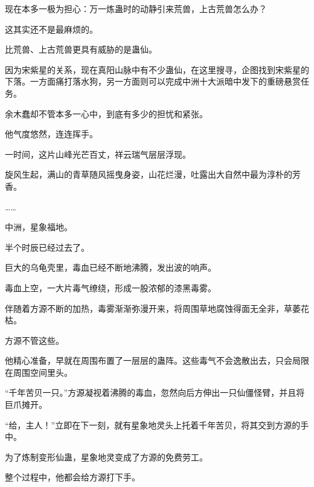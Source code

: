 \begin{this_body}
现在本多一极为担心：万一炼蛊时的动静引来荒兽，上古荒兽怎么办？

这其实还不是最麻烦的。

比荒兽、上古荒兽更具有威胁的是蛊仙。

因为宋紫星的关系，现在真阳山脉中有不少蛊仙，在这里搜寻，企图找到宋紫星的下落。一方面痛打落水狗，另一方面则可以完成中洲十大派暗中发下的重磅悬赏任务。

余木蠢却不管本多一心中，到底有多少的担忧和紧张。

他气度悠然，连连挥手。

一时间，这片山峰光芒百丈，祥云瑞气层层浮现。

旋风生起，满山的青草随风摇曳身姿，山花烂漫，吐露出大自然中最为淳朴的芳香。

……

中洲，星象福地。

半个时辰已经过去了。

巨大的乌龟壳里，毒血已经不断地沸腾，发出波的响声。

毒血上空，一大片毒气缭绕，形成一股浓郁的漆黑毒雾。

伴随着方源不断的加热，毒雾渐渐弥漫开来，将周围草地腐蚀得面无全非，草萎花枯。

方源不管这些。

他精心准备，早就在周围布置了一层层的蛊阵。这些毒气不会逸散出去，只会局限在周围空间里头。

“千年苦贝一只。”方源凝视着沸腾的毒血，忽然向后方伸出一只仙僵怪臂，并且将巨爪摊开。

“给，主人！”立即在下一刻，就有星象地灵头上托着千年苦贝，将其交到方源的手中。

为了炼制变形仙蛊，星象地灵变成了方源的免费劳工。

整个过程中，他都会给方源打下手。

\end{this_body}

